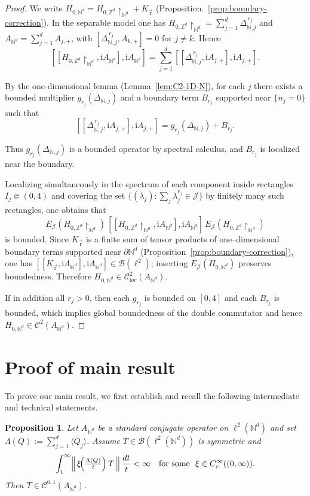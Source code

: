 \documentclass[10pt]{amsart}
\newcommand{\Z}{{\mathbb{Z}}}
\newcommand{\N}{{\mathbb{N}}}
\newcommand{\1}{{\mathbb{I}}}
\newcommand{\Bc}{\mathcal{B}}
\newcommand{\Cc}{\mathcal{C}}
\newcommand{\Jc}{\mathcal{J}}
\numberwithin{equation}{section}
\newtheorem{proposition}[theorem]{Proposition}%
\begin{document}
\begin{proof}
We write $H_{0,\N^d}=H_{0,\Z^d}\!\restriction_{\N^d}+K_{\vec{\mathrm{r}}}$ (Proposition.~\ref{prop:boundary-correction}).
In the separable model one has $H_{0,\Z^d}\!\restriction_{\N^d}=\sum_{j=1}^d \Delta_{\N,j}^{\,r_j}$ and $A_{\N^d}=\sum_{j=1}^d A_{j,+}$, with $[\Delta_{\N,j}^{\,r_j},A_{k,+}]=0$ for $j\neq k$.
Hence
\[
[[H_{0,\Z^d}\!\restriction_{\N^d},\mathrm iA_{\N^d}],\mathrm iA_{\N^d}]
=\sum_{j=1}^d [[\Delta_{\N,j}^{\,r_j},\mathrm iA_{j,+}],\mathrm iA_{j,+}].
\]

By the one-dimensional lemma (Lemma~\ref{lem:C2-1D-N}), for each $j$ there exists a bounded multiplier $g_{r_j}(\Delta_{\N,j})$ and a boundary term $B_{r_j}$ supported near $\{n_j=0\}$ such that
\[
[[\Delta_{\N,j}^{\,r_j},\mathrm iA_{j,+}],\mathrm iA_{j,+}]
= g_{r_j}(\Delta_{\N,j}) + B_{r_j}.
\]

Thus $g_{r_j}(\Delta_{\N,j})$ is a bounded operator by spectral calculus, and $B_{r_j}$ is localized near the boundary.

Localizing simultaneously in the spectrum of each component inside rectangles $I_j\Subset(0,4)$ and covering the set $\{(\lambda_j):\sum_j\lambda_j^{r_j}\in\Jc\}$ by finitely many such rectangles, one obtains that
\[
E_\Jc(H_{0,\Z^d}\!\restriction_{\N^d})\,[[H_{0,\Z^d}\!\restriction_{\N^d},\mathrm iA_{\N^d}],\mathrm iA_{\N^d}]\,E_\Jc(H_{0,\Z^d}\!\restriction_{\N^d})
\]
is bounded. Since $K_{\vec{\mathrm{r}}}$ is a finite sum of tensor products of one--dimensional boundary terms supported near $\partial\N^d$ (Proposition~\ref{prop:boundary-correction}), one has
$[[K_{\vec{\mathrm{r}}},\mathrm iA_{\N^d}],\mathrm iA_{\N^d}]\in\Bc(\ell^2)$; inserting $E_\Jc(H_{0,\N^d})$ preserves boundedness.
Therefore $H_{0,\N^d}\in\Cc^2_{\mathrm loc}(A_{\N^d})$.

If in addition all $r_j>0$, then each $g_{r_j}$ is bounded on $[0,4]$ and each $B_{r_j}$ is bounded, which implies global boundedness of the double commutator and hence $H_{0,\N^d}\in\Cc^2(A_{\N^d})$.
\end{proof}

\section{Proof of main result}

To prove our main result, we first establish and recall the following intermediate and technical statements.

\begin{proposition}\label{prop:C01-functional}
Let $A_{\N^d}$ be a standard conjugate operator on $\ell^2(\N^d)$ and set $\Lambda(Q):=\sum_{j=1}^d\langle Q_j\rangle$.
Assume $T\in\Bc(\ell^2(\N^d))$ is symmetric and
\[
\int_{1}^{\infty}\Bigl\|\,\xi\!\Bigl(\tfrac{\Lambda(Q)}{t}\Bigr)\,T\,\Bigr\|\,\frac{dt}{t}<\infty
\quad\text{for some }\ \xi\in C_c^\infty((0,\infty)).
\]
Then $T\in \mathcal{C}^{0,1}(A_{\N^d})$.
\end{proposition}
\end{document}
